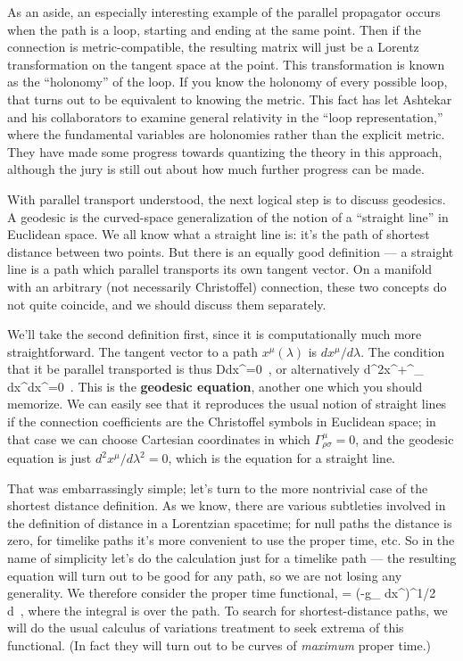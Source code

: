 As an aside, an especially interesting example of the parallel
propagator occurs when the path is a loop, starting and ending at the
same point.  Then if the connection is metric-compatible, the
resulting matrix will just be a Lorentz transformation on the tangent
space at the point.  This transformation is known as the ``holonomy''
of the loop.  If you know the holonomy of every possible loop, that 
turns out to be equivalent to knowing the metric.  This fact has let
Ashtekar and his collaborators to examine general relativity in
the ``loop representation,'' where the fundamental variables are 
holonomies rather than the explicit metric.  They have made some
progress towards quantizing the theory in this approach, although the
jury is still out about how much further progress can be made.

With parallel transport understood, the next logical step is to
discuss geodesics.  A geodesic is the curved-space generalization
of the notion of a ``straight line'' in Euclidean space.  We all
know what a straight line is: it's the path of shortest distance
between two points.  But there is an equally good definition ---
a straight line is a path which parallel transports its own
tangent vector.  On a manifold with an arbitrary (not necessarily
Christoffel) connection, these two concepts do not quite coincide,
and we should discuss them separately.

We'll take the second definition first, since it is computationally
much more straightforward.  The tangent vector to a path $x^\mu(\lambda)$
is $dx^\mu/d\lambda$.  The condition that it be parallel transported 
is thus
\be
  {{D}}{{dx^\mu}}=0\ ,\label{3.46}
\ee
or alternatively
\be
  {{d^2x^\mu}}+\Gamma^\mu_{\rho\sigma}
  {{dx^\rho}}{{dx^\sigma}}=0\ .
  \label{3.47}
\ee
This is the {\bf geodesic equation}, another one which you should
memorize.  We can easily see that it reproduces the usual notion
of straight lines if the connection coefficients are the Christoffel
symbols in Euclidean space; in that case we can choose Cartesian
coordinates in which $\Gamma^\mu_{\rho\sigma}=0$, and the geodesic
equation is just $d^2x^\mu/d\lambda^2=0$, which is the equation for
a straight line.

That was embarrassingly simple; let's turn to the more nontrivial case
of the shortest distance definition.  As we know, there are various
subtleties involved in the definition of distance in a Lorentzian
spacetime; for null paths the distance is zero, for timelike paths
it's more convenient to use the proper time, etc.  So in the name of
simplicity let's do the calculation just for a timelike path ---
the resulting equation will turn
out to be good for any path, so we are not losing
any generality.  We therefore consider the proper time functional,
\be
  \tau = \int \left(-g_
  {{dx^\nu}}\right)^{1/2}\, d\lambda\ ,\label{3.48}
\ee
where the integral is over the path.  To search for shortest-distance
paths, we will do the usual calculus of variations treatment to seek
extrema of this functional.  (In fact they will turn out to be curves
of {\it maximum} proper time.)

